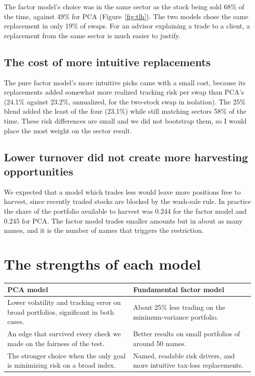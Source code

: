 \documentclass[11pt,letterpaper]{article}
\begin{document}
The factor model's choice was in the same sector as the stock being sold 68\% of the time,
against 49\% for PCA (Figure~\ref{fig:tlh}). The two models chose the same replacement in only 19\% of swaps.
For an advisor explaining a trade to a client, a replacement from the same sector is much
easier to justify.

\subsection{The cost of more intuitive replacements}

The pure factor model's more intuitive picks came with a small cost, because its
replacements added somewhat more realized tracking risk per swap than PCA's (24.1\% against
23.2\%, annualized, for the two-stock swap in isolation). The 25\% blend added the least of
the four (23.1\%) while still matching sectors 58\% of the time. These risk differences are
small and we did not bootstrap them, so I would place the most weight on the sector result.

\subsection{Lower turnover did not create more harvesting opportunities}

We expected that a model which trades less would leave more positions free to harvest,
since recently traded stocks are blocked by the wash-sale rule. In practice the share of the
portfolio available to harvest was 0.244 for the factor model and 0.245 for PCA. The factor
model trades smaller amounts but in about as many names, and it is the number of names that
triggers the restriction.

\section{The strengths of each model}

\begin{table}[H]
\centering\small
\begin{tabularx}{\linewidth}{@{}>{\raggedright\arraybackslash}X>{\raggedright\arraybackslash}X@{}}
\toprule
\textcolor{pca}{\textbf{PCA model}} & \textcolor{factor}{\textbf{Fundamental factor model}} \\
\midrule
Lower volatility and tracking error on broad portfolios, significant in both cases. &
About 25\% less trading on the minimum-variance portfolio. \\\addlinespace[5pt]
An edge that survived every check we made on the fairness of the test. &
Better results on small portfolios of around 50 names. \\\addlinespace[5pt]
The stronger choice when the only goal is minimizing risk on a broad index. &
Named, readable risk drivers, and more intuitive tax-loss replacements. \\
\bottomrule
\end{tabularx}
\end{table}
\end{document}
